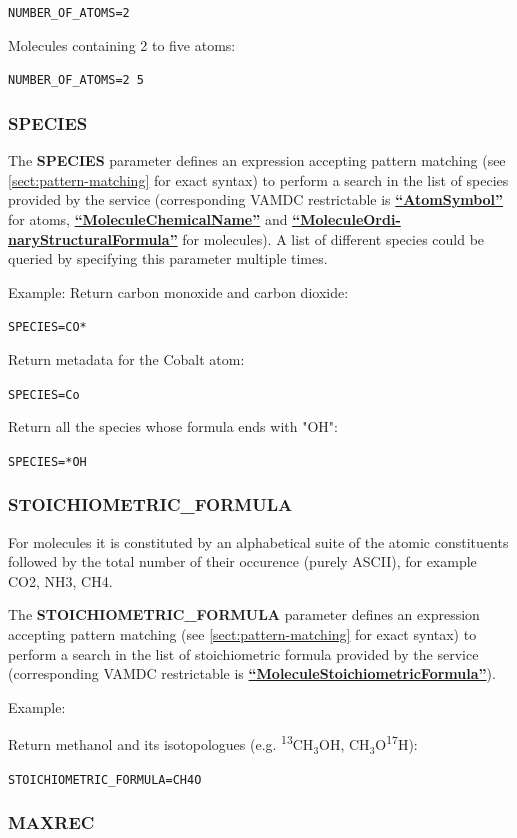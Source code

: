 \documentclass[11pt,a4paper]{ivoa}
\def\vamdcres#1{\href{https://dictionary.vamdc.eu/restrictables/\##1}{\textbf{``\color{vamdccolor}#1''}}}
\newcommand{\parexample}[1]{\noindent\quad\texttt{#1}}
\begin{document}
\parexample{NUMBER\_OF\_ATOMS=2}

Molecules containing 2 to five atoms:

\parexample{NUMBER\_OF\_ATOMS=2 5}

\subsubsection{SPECIES}

The \textbf{SPECIES} parameter defines an expression accepting pattern matching
(see \ref{sect:pattern-matching} for exact syntax) to perform a search
in the list of species provided by the service (corresponding VAMDC restrictable
is \vamdcres{AtomSymbol} for atoms,  \vamdcres{MoleculeChemicalName} and \vamdcres{MoleculeOrdi-
naryStructuralFormula} for molecules). A list of different species
could be queried by specifying this parameter multiple times.

Example: Return carbon monoxide and carbon dioxide:

\parexample{SPECIES=CO*}

Return metadata for the Cobalt atom:

\parexample{SPECIES=Co}

Return all the species whose formula ends with "OH":

\parexample{SPECIES=*OH}

\subsubsection{STOICHIOMETRIC\_FORMULA}

For molecules it is constituted by an alphabetical suite of the atomic constituents followed
by the total number of their occurence (purely ASCII), for example CO2, NH3, CH4.

The \textbf{STOICHIOMETRIC\_FORMULA} parameter defines an expression accepting pattern matching
(see \ref{sect:pattern-matching} for exact syntax) to perform
a search in the list of stoichiometric formula provided by the service (corresponding VAMDC restrictable
is \vamdcres{MoleculeStoichiometricFormula}).

Example:

Return methanol and its isotopologues (e.g. \textsuperscript{13}CH$_3$OH, CH$_3$O\textsuperscript{17}H):

\parexample{STOICHIOMETRIC\_FORMULA=CH4O}

\subsubsection{MAXREC}
\end{document}
